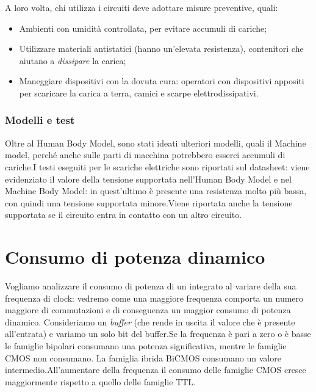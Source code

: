 \documentclass[
]{book}
\providecommand{\tightlist}{%
  \setlength{\itemsep}{0pt}\setlength{\parskip}{0pt}}
\begin{document}
A loro volta, chi utilizza i circuiti deve adottare misure preventive,
quali:

\begin{itemize}
\tightlist
\item
  Ambienti con umidità controllata, per evitare accumuli di cariche;
\item
  Utilizzare materiali antistatici (hanno un'elevata resistenza),
  contenitori che aiutano a \emph{dissipare} la carica;
\item
  Maneggiare dispositivi con la dovuta cura: operatori con dispositivi
  appositi per scaricare la carica a terra, camici e scarpe
  elettrodissipativi.
\end{itemize}

\subsubsection{Modelli e test}\label{modelli-e-test}

Oltre al Human Body Model, sono stati ideati ulteriori modelli, quali il
Machine model, perché anche sulle parti di macchina potrebbero esserci
accumuli di cariche.\newline I testi eseguiti per le scariche elettriche
sono riportati sul datasheet: viene evidenziato il valore della tensione
supportata nell'Human Body Model e nel Machine Body Model: in
quest'ultimo è presente una resistenza molto più bassa, con quindi una
tensione supportata minore.\newline Viene riportata anche la tensione
supportata se il circuito entra in contatto con un altro circuito.

\section{Consumo di potenza dinamico}\label{consumo-di-potenza-dinamico}

Vogliamo analizzare il consumo di potenza di un integrato al variare
della sua frequenza di clock: vedremo come una maggiore frequenza
comporta un numero maggiore di commutazioni e di conseguenza un maggior
consumo di potenza dinamico. Consideriamo un \emph{buffer} (che rende in
uscita il valore che è presente all'entrata) e variamo un solo bit del
buffer.\newline Se la frequenza è pari a zero o è basse le famiglie
bipolari consumano una potenza significativa, mentre le famiglie CMOS
non consumano. La famiglia ibrida BiCMOS consumano un valore
intermedio.\newline All'aumentare della frequenza il consumo delle
famiglie CMOS cresce maggiormente rispetto a quello delle famiglie TTL.
\end{document}
